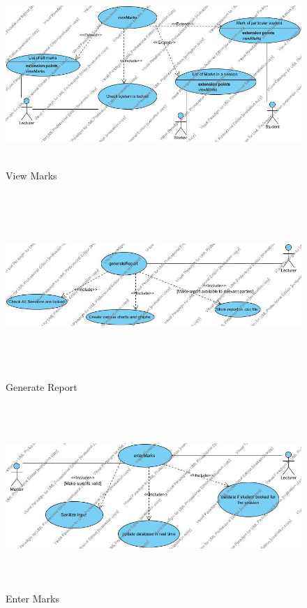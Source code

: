 \documentclass[a4paper]{article}
\begin{document}
			\begin{figure}[h]
				\caption{View Marks}
				\includegraphics[height=7cm]{viewMarks}
			\end{figure}
			\begin{figure}[h]
				\caption{Generate Report}
				\includegraphics[height=7cm]{generateReport}
			\end{figure}
			\begin{figure}[h]
				\caption{Enter Marks}
				\includegraphics[height=7cm]{enterMarks}
			\end{figure}
\end{document}
